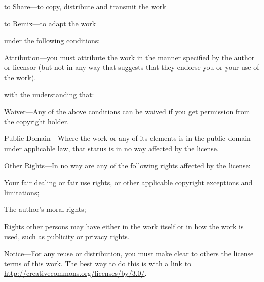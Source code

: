 \begin{aosaitemize}
  \item to Share---to copy, distribute and transmit the work
  \item to Remix---to adapt the work
\end{aosaitemize}

\noindent
under the following conditions:

\begin{aosaitemize}
  \item Attribution---you must attribute the work in the manner
    specified by the author or licensor (but not in any way that
    suggests that they endorse you or your use of the work).
\end{aosaitemize}

\noindent
with the understanding that:

\begin{aosaitemize}

  \item Waiver---Any of the above conditions can be waived if you get
    permission from the copyright holder.

  \item Public Domain---Where the work or any of its elements is in
    the public domain under applicable law, that status is in no way
    affected by the license.

  \item Other Rights---In no way are any of the following rights
    affected by the license:
    \begin{aosaitemize}

      \item Your fair dealing or fair use rights, or other applicable
        copyright exceptions and limitations;

      \item The author's moral rights;

      \item Rights other persons may have either in the work itself or
        in how the work is used, such as publicity or privacy rights.

    \end{aosaitemize}

  \item Notice---For any reuse or distribution, you must make clear to
    others the license terms of this work. The best way to do this is
    with a link to \url{http://creativecommons.org/licenses/by/3.0/}.

\end{aosaitemize}

